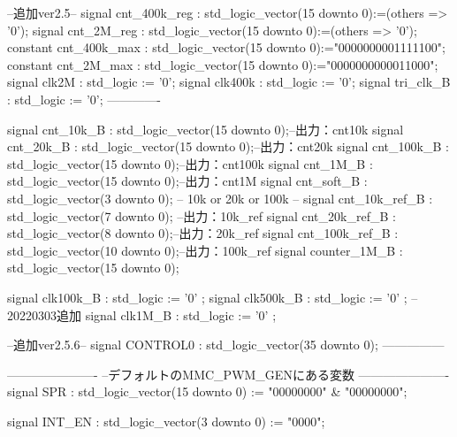 \begin{mylisting}[language=VHDL,caption=ゲート信号出力モジュール,label=MMC_PWM_GEN_module_VHDL]
	--追加ver2.5--
	signal cnt_400k_reg    : std_logic_vector(15 downto 0):=(others => '0');
	signal cnt_2M_reg      : std_logic_vector(15 downto 0):=(others => '0');
	constant cnt_400k_max  : std_logic_vector(15 downto 0):="0000000001111100";
	constant cnt_2M_max    : std_logic_vector(15 downto 0):="0000000000011000";
	signal clk2M           : std_logic			:= '0';	
	signal clk400k         : std_logic			:= '0';	
	signal tri_clk_B : std_logic			:= '0';	
	-------------
	
	
	signal	cnt_10k_B : std_logic_vector(15 downto 0);--出力：cnt10k
	signal	cnt_20k_B : std_logic_vector(15 downto 0);--出力：cnt20k
	signal	cnt_100k_B : std_logic_vector(15 downto 0);--出力：cnt100k
	signal	cnt_1M_B : std_logic_vector(15 downto 0);--出力：cnt1M
	signal	cnt_soft_B : std_logic_vector(3 downto 0); -- 10k or 20k or 100k --
	signal	cnt_10k_ref_B : std_logic_vector(7 downto 0); --出力：10k_ref
	signal	cnt_20k_ref_B : std_logic_vector(8 downto 0);--出力：20k_ref
	signal	cnt_100k_ref_B : std_logic_vector(10 downto 0);--出力：100k_ref
	signal	counter_1M_B : std_logic_vector(15 downto 0);
	
	signal	clk100k_B : std_logic := '0' ;
	signal	clk500k_B : std_logic := '0' ;
	--20220303追加
	signal	clk1M_B : std_logic := '0' ;
	
	--追加ver2.5.6--	
	signal	CONTROL0 : std_logic_vector(35 downto 0);
	---------------
	


	----------------------
	--デフォルトのMMC_PWM_GENにある変数
	----------------------
	signal SPR					: std_logic_vector(15 downto 0)		:= "00000000" & "00000000";

	signal INT_EN				: std_logic_vector(3 downto 0)		:= "0000";


\end{mylisting}

